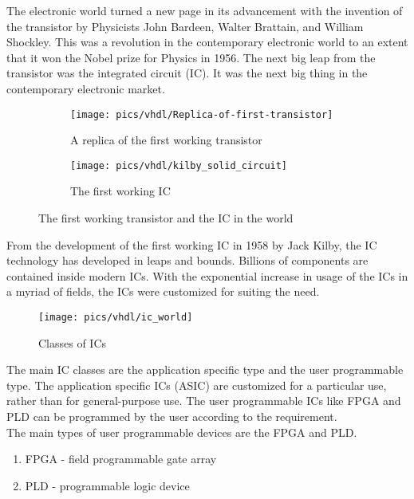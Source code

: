 The electronic world turned a new page in its advancement with the invention of the transistor by  Physicists John Bardeen, Walter Brattain, and William Shockley. This was a revolution in the contemporary electronic world to an extent that it won the Nobel prize for Physics in 1956. The next big leap from the  transistor was the integrated circuit (IC). It was the next big thing in the contemporary electronic market.

\begin{figure}[!h]
	\centering
	\begin{subfigure}{.5\textwidth}
		\centering
		\texttt{[image: pics/vhdl/Replica-of-first-transistor]}
		\caption{A replica of the first working transistor}
		\label{fig:replica-of-first-transistor}
	\end{subfigure}%
	\begin{subfigure}{.5\textwidth}
		\centering
		\texttt{[image: pics/vhdl/kilby\_solid\_circuit]}
		\caption{The first working IC}
		\label{fig:kilby_solid_circuit}
	\end{subfigure}
	\caption{The first working transistor and the IC in the world}
	\label{fig:animals}
\end{figure}


\noindent
From the development of the first working IC in 1958 by Jack Kilby, the IC technology has developed in leaps and bounds. Billions of components are contained inside modern ICs. With the exponential increase in usage of the ICs in a myriad of fields, the  ICs were customized for suiting the need. 

\begin{figure}[!hb]
	\centering
	\texttt{[image: pics/vhdl/ic\_world]}
	\caption{Classes of ICs}
	\label{fig:icworld}
\end{figure}

\noindent
The main IC classes are the application specific type and the user programmable type. The application specific ICs (ASIC) are customized for a particular use, rather than for general-purpose use. The user programmable ICs like FPGA and PLD can be programmed by the user according to the requirement.\\

\noindent
The main types of user programmable devices are the FPGA and PLD. 
\begin{enumerate}
	\item FPGA -  field programmable gate array 
	\item PLD - programmable logic device
\end{enumerate}

